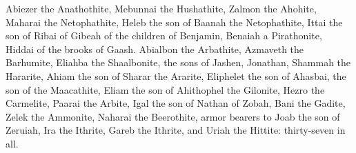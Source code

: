 {Abiezer the Anathothite, Mebunnai the Hushathite,
Zalmon the Ahohite, Maharai the Netophathite,
Heleb the son of Baanah the Netophathite, Ittai the son of Ribai of Gibeah of the children of Benjamin,
Benaiah a Pirathonite, Hiddai of the brooks of Gaash.
Abialbon the Arbathite, Azmaveth the Barhumite,
Eliahba the Shaalbonite, the sons of Jashen, Jonathan,
Shammah the Hararite, Ahiam the son of Sharar the Ararite,
Eliphelet the son of Ahasbai, the son of the Maacathite, Eliam the son of Ahithophel the Gilonite,
Hezro the Carmelite, Paarai the Arbite,
Igal the son of Nathan of Zobah, Bani the Gadite,
Zelek the Ammonite, Naharai the Beerothite, armor bearers to Joab the son of Zeruiah,
Ira the Ithrite, Gareb the Ithrite,
and Uriah the Hittite: thirty-seven in all.

}

